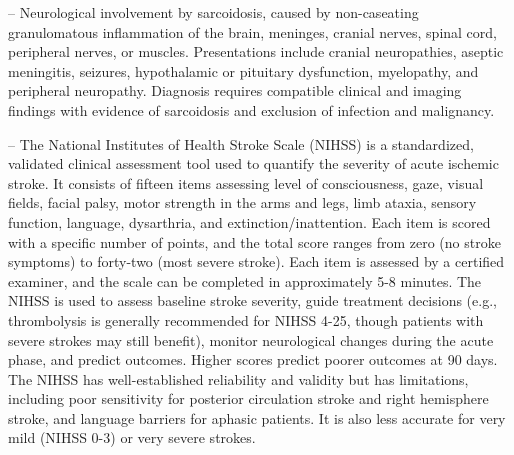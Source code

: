 -- Neurological involvement by sarcoidosis, caused by non-caseating granulomatous inflammation of the brain, meninges, cranial nerves, spinal cord, peripheral nerves, or muscles. Presentations include cranial neuropathies, aseptic meningitis, seizures, hypothalamic or pituitary dysfunction, myelopathy, and peripheral neuropathy. Diagnosis requires compatible clinical and imaging findings with evidence of sarcoidosis and exclusion of infection and malignancy.

-- The National Institutes of Health Stroke Scale (NIHSS) is a standardized, validated clinical assessment tool used to quantify the severity of acute ischemic stroke. It consists of fifteen items assessing level of consciousness, gaze, visual fields, facial palsy, motor strength in the arms and legs, limb ataxia, sensory function, language, dysarthria, and extinction/inattention. Each item is scored with a specific number of points, and the total score ranges from zero (no stroke symptoms) to forty-two (most severe stroke). Each item is assessed by a certified examiner, and the scale can be completed in approximately 5-8 minutes. The NIHSS is used to assess baseline stroke severity, guide treatment decisions (e.g., thrombolysis is generally recommended for NIHSS 4-25, though patients with severe strokes may still benefit), monitor neurological changes during the acute phase, and predict outcomes. Higher scores predict poorer outcomes at 90 days. The NIHSS has well-established reliability and validity but has limitations, including poor sensitivity for posterior circulation stroke and right hemisphere stroke, and language barriers for aphasic patients. It is also less accurate for very mild (NIHSS 0-3) or very severe strokes.

